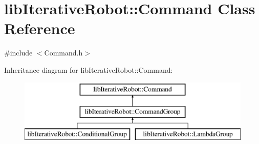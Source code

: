 \hypertarget{classlib_iterative_robot_1_1_command}{}\section{lib\+Iterative\+Robot\+::Command Class Reference}
\label{classlib_iterative_robot_1_1_command}


{\ttfamily \#include $<$Command.\+h$>$}

Inheritance diagram for lib\+Iterative\+Robot\+::Command\+:\begin{figure}[H]
\begin{center}
\leavevmode
\includegraphics[height=3.000000cm]{classlib_iterative_robot_1_1_command}
\end{center}
\end{figure}
